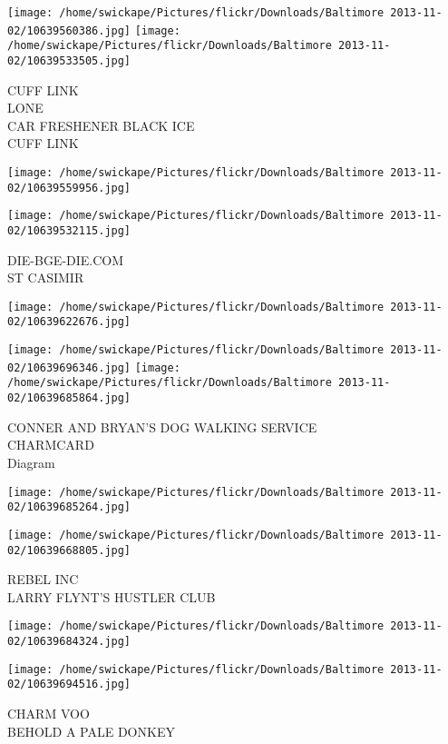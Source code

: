 \documentclass[10pt,letterpaper]{article}
\begin{document}
\texttt{[image: /home/swickape/Pictures/flickr/Downloads/Baltimore 2013-11-02/10639560386.jpg]}
\texttt{[image: /home/swickape/Pictures/flickr/Downloads/Baltimore 2013-11-02/10639533505.jpg]}

CUFF LINK\\
LONE\\
CAR FRESHENER BLACK ICE\\
CUFF LINK
\pagebreak

\texttt{[image: /home/swickape/Pictures/flickr/Downloads/Baltimore 2013-11-02/10639559956.jpg]}

\vspace{0.25in}
\texttt{[image: /home/swickape/Pictures/flickr/Downloads/Baltimore 2013-11-02/10639532115.jpg]}

DIE{-}BGE{-}DIE.COM\\
ST CASIMIR
\pagebreak

\texttt{[image: /home/swickape/Pictures/flickr/Downloads/Baltimore 2013-11-02/10639622676.jpg]}

\vspace{0.25in}
\texttt{[image: /home/swickape/Pictures/flickr/Downloads/Baltimore 2013-11-02/10639696346.jpg]}
\texttt{[image: /home/swickape/Pictures/flickr/Downloads/Baltimore 2013-11-02/10639685864.jpg]}

CONNER AND BRYAN'S DOG WALKING SERVICE\\
CHARMCARD\\
Diagram
\pagebreak

\texttt{[image: /home/swickape/Pictures/flickr/Downloads/Baltimore 2013-11-02/10639685264.jpg]}

\vspace{0.25in}
\texttt{[image: /home/swickape/Pictures/flickr/Downloads/Baltimore 2013-11-02/10639668805.jpg]}

REBEL INC\\
LARRY FLYNT'S HUSTLER CLUB
\pagebreak

\texttt{[image: /home/swickape/Pictures/flickr/Downloads/Baltimore 2013-11-02/10639684324.jpg]}

\vspace{0.25in}
\texttt{[image: /home/swickape/Pictures/flickr/Downloads/Baltimore 2013-11-02/10639694516.jpg]}

CHARM VOO\\
BEHOLD A PALE DONKEY
\pagebreak
\end{document}
